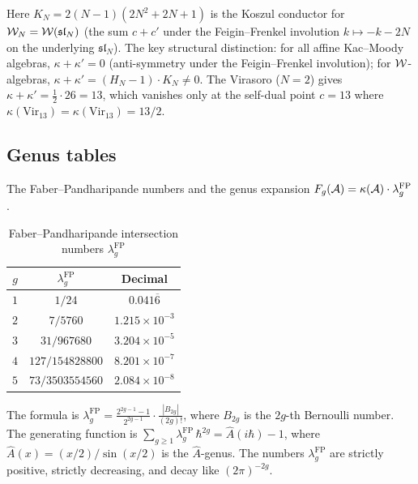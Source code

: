 \noindent
Here $K_N = 2(N{-}1)(2N^2{+}2N{+}1)$ is the Koszul conductor for
$\mathcal{W}_N = \mathcal{W}(\mathfrak{sl}_N)$ (the sum $c + c'$ under the
Feigin--Frenkel involution $k \mapsto -k - 2N$ on the underlying
$\mathfrak{sl}_N$). The key structural distinction: for all
affine Kac--Moody algebras, $\kappa + \kappa' = 0$ (anti-symmetry
under the Feigin--Frenkel involution); for $\mathcal{W}$-algebras,
$\kappa + \kappa' = (H_N - 1) \cdot K_N \neq 0$.
The Virasoro ($N = 2$) gives $\kappa + \kappa' = \tfrac{1}{2} \cdot 26
= 13$, which vanishes only at the self-dual point $c = 13$
where $\kappa(\mathrm{Vir}_{13}) = \kappa(\mathrm{Vir}_{13}) = 13/2$.


\subsection{Genus tables}\label{ssec:genus-tables}

The Faber--Pandharipande numbers and the genus expansion
$F_g(\mathcal{A}) = \kappa(\mathcal{A}) \cdot \lambda_g^{\mathrm{FP}}$.

\begin{table}[ht]
\centering
\caption{Faber--Pandharipande intersection numbers $\lambda_g^{\mathrm{FP}}$}
\label{tab:faber-pandharipande}
\renewcommand{\arraystretch}{1.35}
{\small
\begin{tabular}{ccc}
\toprule
$g$ & $\lambda_g^{\mathrm{FP}}$ & Decimal \\
\midrule
$1$ & $1/24$ & $0.041\overline{6}$ \\
$2$ & $7/5760$ & $1.215 \times 10^{-3}$ \\
$3$ & $31/967680$ & $3.204 \times 10^{-5}$ \\
$4$ & $127/154828800$ & $8.201 \times 10^{-7}$ \\
$5$ & $73/3503554560$ & $2.084 \times 10^{-8}$ \\
\bottomrule
\end{tabular}
}
\end{table}

\noindent
The formula is
$\lambda_g^{\mathrm{FP}} = \frac{2^{2g-1} - 1}{2^{2g-1}}
\cdot \frac{|B_{2g}|}{(2g)!}$,
where $B_{2g}$ is the $2g$-th Bernoulli number. The generating
function is $\sum_{g \geq 1} \lambda_g^{\mathrm{FP}}\, \hbar^{2g}
= \hat{A}(i\hbar) - 1$, where $\hat{A}(x) = (x/2)/\sin(x/2)$ is
the $\hat{A}$-genus. The numbers $\lambda_g^{\mathrm{FP}}$ are
strictly positive, strictly decreasing, and decay like
$(2\pi)^{-2g}$.

